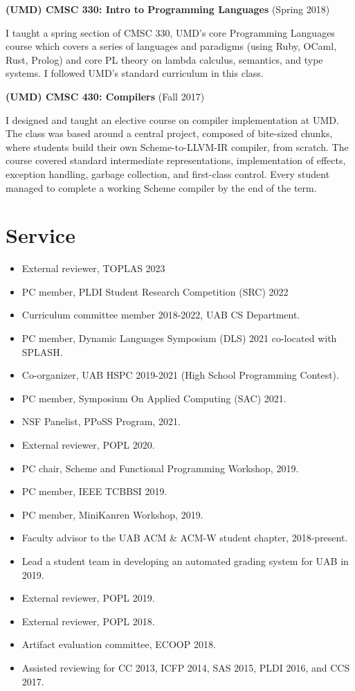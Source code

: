 \documentclass[line]{res}
\begin{document}
\begin{resume}
\textbf{(UMD) CMSC 330: Intro to Programming Languages} (Spring 2018)

I taught a spring section of CMSC 330, UMD's core Programming Languages course which covers a series of languages and paradigms (using Ruby, OCaml, Rust, Prolog) and core PL theory on lambda calculus, semantics, and type systems. I followed UMD's standard curriculum in this class.

\textbf{(UMD) CMSC 430: Compilers} (Fall 2017)

I designed and taught an elective course on compiler implementation at UMD. The class was based around a central project, composed of bite-sized chunks, where students build their own Scheme-to-LLVM-IR compiler, from scratch. The course covered standard intermediate representations, implementation of effects, exception handling, garbage collection, and first-class control. Every student managed to complete a working Scheme compiler by the end of the term.


\section{\large Service} \vspace{0.15in}
\begin{itemize}
    \item External reviewer, TOPLAS 2023
    \item PC member, PLDI Student Research Competition (SRC) 2022
    \item Curriculum committee member 2018-2022, UAB CS Department.
    \item PC member, Dynamic Languages Symposium (DLS) 2021 co-located with SPLASH.
    \item Co-organizer, UAB HSPC 2019-2021 (High School Programming Contest).
    \item PC member, Symposium On Applied Computing (SAC) 2021.
    \item NSF Panelist, PPoSS Program, 2021.
    \item External reviewer, POPL 2020.
    \item PC chair, Scheme and Functional Programming Workshop, 2019.
    \item PC member, IEEE TCBBSI 2019.
    \item PC member, MiniKanren Workshop, 2019.
    \item Faculty advisor to the UAB ACM \& ACM-W student chapter, 2018-present.
    \item Lead a student team in developing an automated grading system for UAB in 2019.
    \item External reviewer, POPL 2019. 
    \item External reviewer, POPL 2018. 
    \item Artifact evaluation committee, ECOOP 2018.
    \item Assisted reviewing for CC 2013, ICFP 2014, SAS 2015, PLDI 2016, and CCS 2017.
\end{itemize}


\end{resume}
\end{document}

